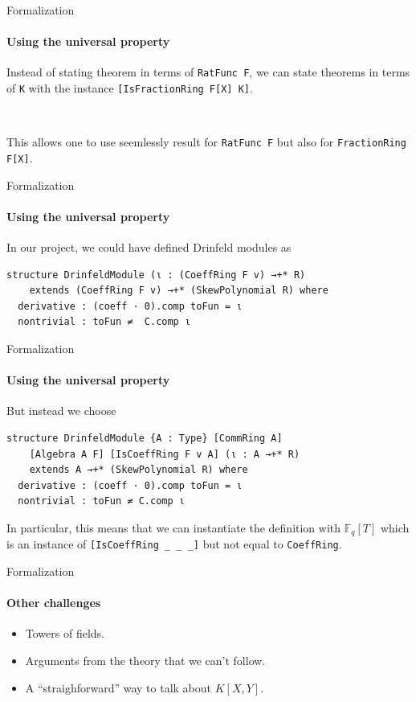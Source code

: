 \begin{frame}[fragile]{Formalization}
	\framesubtitle{Using the universal property}

Instead of stating theorem in terms of \texttt{RatFunc F}, we can state theorems in terms of \texttt{K} with the instance \texttt{[IsFractionRing F[X] K]}.

\pause

\

This allows one to use seemlessly result for \texttt{RatFunc F} but also for \texttt{FractionRing F[X]}.

\end{frame}

\begin{frame}[fragile]{Formalization}
	\framesubtitle{Using the universal property}

In our project, we could have defined Drinfeld modules as 

        \begin{verbatim}
structure DrinfeldModule (ι : (CoeffRing F v) →+* R)
    extends (CoeffRing F v) →+* (SkewPolynomial R) where
  derivative : (coeff · 0).comp toFun = ι
  nontrivial : toFun ≠  C.comp ι
        \end{verbatim}

\end{frame}

\begin{frame}[fragile]{Formalization}
	\framesubtitle{Using the universal property}

But instead we choose

        \begin{verbatim}
structure DrinfeldModule {A : Type} [CommRing A]
    [Algebra A F] [IsCoeffRing F v A] (ι : A →+* R)
    extends A →+* (SkewPolynomial R) where
  derivative : (coeff · 0).comp toFun = ι
  nontrivial : toFun ≠ C.comp ι
        \end{verbatim}

\pause

In particular, this means that we can instantiate the definition with
$\mathbb{F}_q[T]$ which is an instance of \texttt{[IsCoeffRing _ _ _]} but not equal to \texttt{CoeffRing}.

\end{frame}

\begin{frame}[fragile]{Formalization}
	\framesubtitle{Other challenges}

\begin{itemize}
    \item Towers of fields.
    \item Arguments from the theory that we can't follow.
    \item A ``straighforward'' way to talk about $K[X,Y]$.
\end{itemize}

\end{frame}

